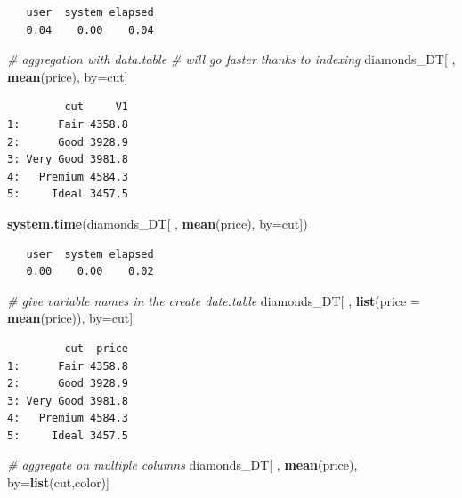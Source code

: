 \documentclass[
]{book}
\newenvironment{Shaded}{\begin{snugshade}}{\end{snugshade}}
\newcommand{\CommentTok}[1]{\textcolor[rgb]{0.56,0.35,0.01}{\textit{#1}}}
\newcommand{\DataTypeTok}[1]{\textcolor[rgb]{0.13,0.29,0.53}{#1}}
\newcommand{\KeywordTok}[1]{\textcolor[rgb]{0.13,0.29,0.53}{\textbf{#1}}}
\newcommand{\NormalTok}[1]{#1}
\begin{document}
\begin{verbatim}
   user  system elapsed 
   0.04    0.00    0.04 
\end{verbatim}

\begin{Shaded}
\begin{Highlighting}[]
\CommentTok{# aggregation with data.table}
\CommentTok{# will go faster thanks to indexing}
\NormalTok{diamonds_DT[ , }\KeywordTok{mean}\NormalTok{(price), by=cut]}
\end{Highlighting}
\end{Shaded}

\begin{verbatim}
         cut     V1
1:      Fair 4358.8
2:      Good 3928.9
3: Very Good 3981.8
4:   Premium 4584.3
5:     Ideal 3457.5
\end{verbatim}

\begin{Shaded}
\begin{Highlighting}[]
\KeywordTok{system.time}\NormalTok{(diamonds_DT[ , }\KeywordTok{mean}\NormalTok{(price), }\DataTypeTok{by=}\NormalTok{cut])}
\end{Highlighting}
\end{Shaded}

\begin{verbatim}
   user  system elapsed 
   0.00    0.00    0.02 
\end{verbatim}

\begin{Shaded}
\begin{Highlighting}[]
\CommentTok{# give variable names in the create date.table}
\NormalTok{diamonds_DT[ , }\KeywordTok{list}\NormalTok{(}\DataTypeTok{price =} \KeywordTok{mean}\NormalTok{(price)), by=cut]}
\end{Highlighting}
\end{Shaded}

\begin{verbatim}
         cut  price
1:      Fair 4358.8
2:      Good 3928.9
3: Very Good 3981.8
4:   Premium 4584.3
5:     Ideal 3457.5
\end{verbatim}

\begin{Shaded}
\begin{Highlighting}[]
\CommentTok{# aggregate on multiple columns}
\NormalTok{diamonds_DT[ , }\KeywordTok{mean}\NormalTok{(price), by=}\KeywordTok{list}\NormalTok{(cut,color)]}
\end{Highlighting}
\end{Shaded}
\end{document}
